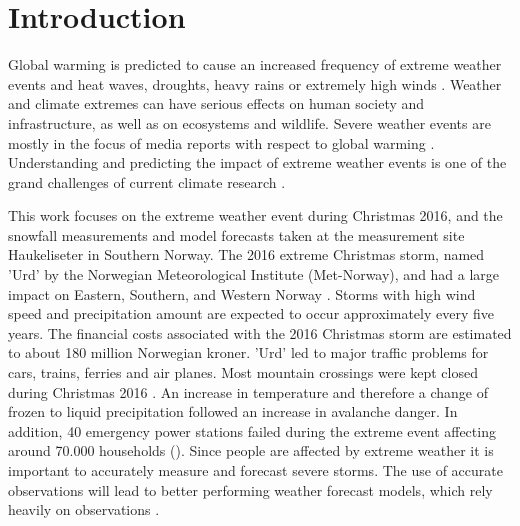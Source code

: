 \chapter{Introduction}
\label{ch:intro}
Global warming is predicted to cause an increased frequency of extreme weather events and heat waves, droughts, heavy rains or extremely high winds \citep{hansen_warmer_2014}. Weather and climate extremes can have serious effects on human society and infrastructure, as well as on ecosystems and wildlife. Severe weather events are mostly in the focus of media reports with respect to global warming \citep{meehl_introduction_2000}. Understanding and predicting the impact of extreme weather events is one of the grand challenges of current climate research \citep{stocker_working_2013,field_summary_2014}.
\par\medskip
\noindent
This work focuses on the extreme weather event during Christmas 2016, and the snowfall measurements and model forecasts taken at the measurement site Haukeliseter in Southern Norway. The 2016 extreme Christmas storm, named 'Urd' by the Norwegian Meteorological Institute (Met-Norway), and had a large impact on Eastern, Southern, and Western Norway \citep{olsen_ekstremvaerrapport._2017}. Storms with high wind speed and precipitation amount are expected to occur approximately every five years. The financial costs associated with the 2016 Christmas storm are estimated to about 180 million Norwegian kroner. 'Urd' led to major traffic problems for cars, trains, ferries and air planes. Most mountain crossings were kept closed during Christmas 2016 \citep{olsen_ekstremvaerrapport._2017}. An increase in temperature and therefore a change of frozen to liquid precipitation followed an increase in avalanche danger. In addition, 40 emergency power stations failed during the extreme event affecting around 70.000 households ().
Since people are affected by extreme weather it is important to accurately measure and forecast severe storms. The use of accurate observations will lead to better performing weather forecast models, which rely heavily on observations \citep{joos_influence_2012}. 

